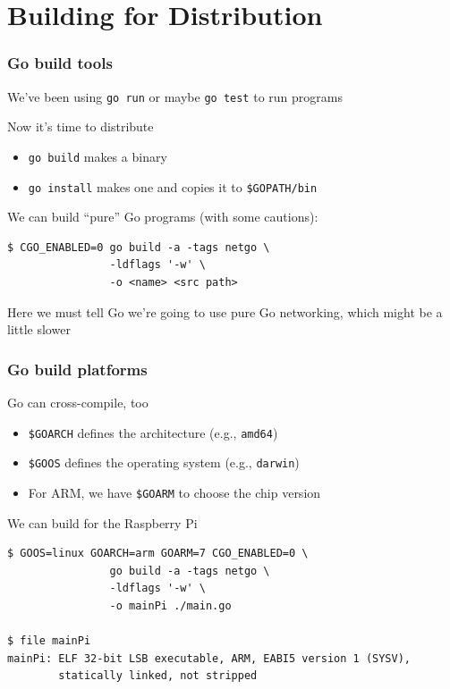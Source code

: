 \documentclass[handout,compress,t,11pt]{beamer}
\begin{document}

\section{Building for Distribution}
\begin{frame}[fragile]
    \frametitle{Go build tools}
We've been using \verb|go run| or maybe \verb|go test| to run programs \par
\vspace{\baselineskip}
Now it's time to distribute
\begin{itemize}
    \item \verb|go build| makes a binary
    \item \verb|go install| makes one and copies it to \verb|$GOPATH/bin|
\end{itemize}
\vspace{\baselineskip}
We can build ``pure'' Go programs (with some cautions):
{\small\begin{verbatim}
$ CGO_ENABLED=0 go build -a -tags netgo \
                -ldflags '-w' \
                -o <name> <src path>
\end{verbatim}}
Here we must tell Go we're going to use pure Go networking, which might
be a little slower
\end{frame}

\begin{frame}[fragile]
    \frametitle{Go build platforms}
Go can cross-compile, too
\begin{itemize}
    \item \verb|$GOARCH| defines the architecture (e.g., \verb|amd64|)
    \item \verb|$GOOS| defines the operating system (e.g., \verb|darwin|)
    \item For ARM, we have \verb|$GOARM| to choose the chip version
\end{itemize}
\vspace{\baselineskip}
We can build for the Raspberry Pi
{\scriptsize
\begin{verbatim}
$ GOOS=linux GOARCH=arm GOARM=7 CGO_ENABLED=0 \
                go build -a -tags netgo \
                -ldflags '-w' \
                -o mainPi ./main.go

$ file mainPi
mainPi: ELF 32-bit LSB executable, ARM, EABI5 version 1 (SYSV), 
        statically linked, not stripped
\end{verbatim}}
\end{frame}
\end{document}
